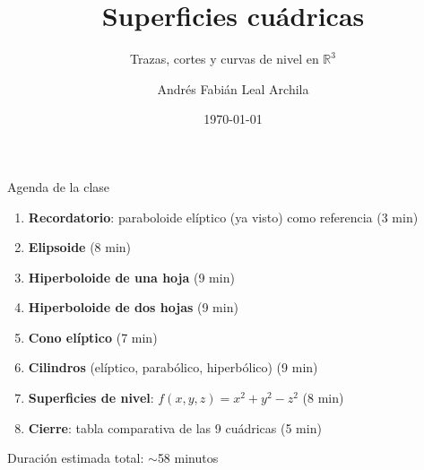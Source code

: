 \documentclass[11pt,aspectratio=169]{beamer}
\title{Superficies cuádricas}
\subtitle{Trazas, cortes y curvas de nivel en $\mathbb{R}^3$}
\author{Andrés Fabián Leal Archila}
\institute{Cálculo III (Multivariable) --- Cód. 20254}
\date{\today}
\begin{document}
\portada
\begin{frame}{Agenda de la clase}
  \begin{enumerate}
    \setlength{\itemsep}{8pt}
    \item \textbf{Recordatorio}: paraboloide elíptico (ya visto) como referencia \hfill{\small\color{gray60}(3 min)}
    \item \textbf{Elipsoide} \hfill{\small\color{gray60}(8 min)}
    \item \textbf{Hiperboloide de una hoja} \hfill{\small\color{gray60}(9 min)}
    \item \textbf{Hiperboloide de dos hojas} \hfill{\small\color{gray60}(9 min)}
    \item \textbf{Cono elíptico} \hfill{\small\color{gray60}(7 min)}
    \item \textbf{Cilindros} (elíptico, parabólico, hiperbólico) \hfill{\small\color{gray60}(9 min)}
    \item \textbf{Superficies de nivel}: $f(x,y,z)=x^2+y^2-z^2$ \hfill{\small\color{gray60}(8 min)}
    \item \textbf{Cierre}: tabla comparativa de las 9 cuádricas \hfill{\small\color{gray60}(5 min)}
  \end{enumerate}
  \vfill
  \begin{center}
    \small\color{gray60} Duración estimada total: $\sim$58 minutos
  \end{center}
\end{frame}
\end{document}
